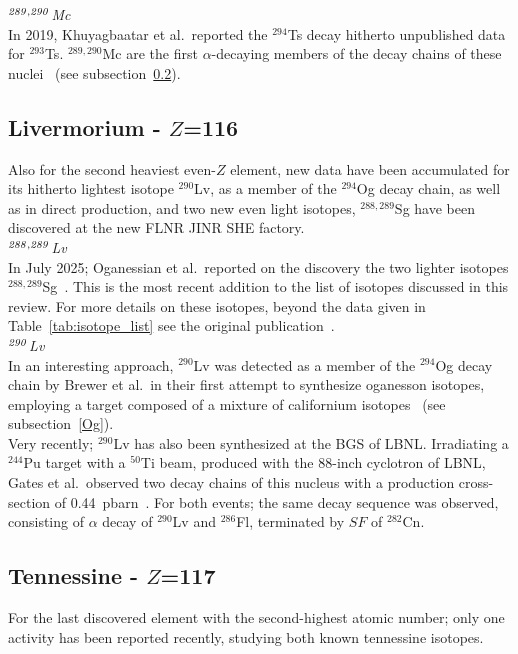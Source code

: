 {\it $^{\it289,290}$Mc}\\
In 2019, Khuyagbaatar et al.~reported the $^{294}$Ts decay hitherto unpublished data for $^{293}$Ts. $^{289,290}$Mc are the first $\alpha$-decaying members of the decay chains of these nuclei~\cite{Khuyagbaatar2019} (see subsection~\ref{Ts}).

\subsection{Livermorium - $Z$=116}\label{Lv}
Also for the second heaviest even-$Z$ element, new data have been accumulated for its hitherto lightest isotope $^{290}$Lv, as a member of the $^{294}$Og decay chain, as well as in direct production, and two new even light isotopes, $^{288,289}$Sg have been discovered at the new FLNR JINR SHE factory.\\

{\it $^{\it288,289}$Lv}\\
In July 2025; Oganessian et al.~reported on the discovery the two lighter isotopes $^{288,289}$Sg~\cite{Oganessian2025}.
This is the most recent addition to the list of isotopes discussed in this review.
For more details on these isotopes, beyond the data given in Table~\ref{tab:isotope_list} see the original publication~\cite{Oganessian2025}.\\

{\it $^{\it290}$Lv}\\
In an interesting approach, $^{290}$Lv was detected as a member of the $^{294}$Og decay chain by Brewer et al.~in their first attempt to synthesize oganesson isotopes, employing a target composed of a mixture of californium isotopes~\cite{Brewer2018} (see subsection~\ref{Og}).\\

Very recently; $^{290}$Lv has also been synthesized at the BGS of LBNL.
Irradiating a $^{244}$Pu target with a $^{50}$Ti beam, produced with the 88-inch cyclotron of LBNL, Gates et al.~observed two decay chains of this nucleus with a production cross-section of 0.44~pbarn~\cite{Gates2024}. 
For both events; the same decay sequence was observed, consisting of $\alpha$ decay of $^{290}$Lv and $^{286}$Fl, terminated by $SF$ of $^{282}$Cn.

\subsection{Tennessine - $Z$=117}\label{Ts}
For the last discovered element with the second-highest atomic number; only one activity has been reported recently, studying both known tennessine isotopes.\\

